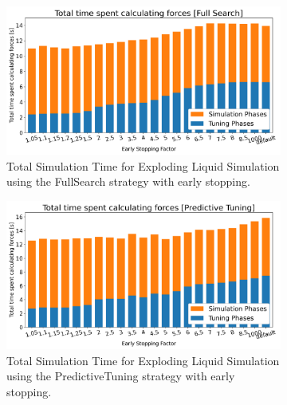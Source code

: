 \documentclass[conference]{IEEEtran}
\begin{document}
\begin{figure}[h]
    \centering
    \begin{subfigure}[b]{\columnwidth}
        \includegraphics[width=\columnwidth]{../data/explodingLiquid/cluster/fullSearchEvidenceBased_2threads/analytics/total_time_average.png}

        \caption{Total Simulation Time for Exploding Liquid Simulation using the FullSearch strategy with early stopping.}
        \label{fig:full_search}
    \end{subfigure}

    \begin{subfigure}[b]{\columnwidth}
        \centering

        \includegraphics[width=\columnwidth]{../data/explodingLiquid/cluster/predictiveTuningEvidenceBased_2threads/analytics/total_time_average.png}

        \caption{Total Simulation Time for Exploding Liquid Simulation using the PredictiveTuning strategy with early stopping.}
        \label{fig:predictive_tuning}
    \end{subfigure}

    \begin{subfigure}[b]{\columnwidth}
        \centering


\end{subfigure}
\end{figure}
\end{document}
